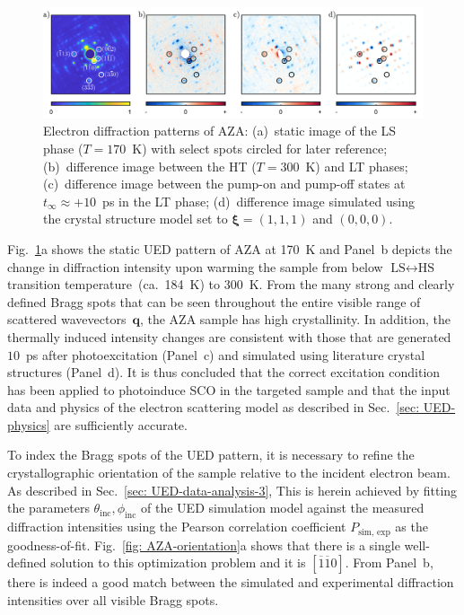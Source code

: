 \begin{figure}[ht!]
  \centering
  \includegraphics[width = \textwidth]{Figures/fig_AZA_UEDimages.pdf}
  \caption[Static and time-resolved electron diffraction patterns of AZA.]{
    Electron diffraction patterns of AZA:
    (a)~static image of the LS phase ($T = 170$~K) with select spots circled for later reference;
    (b)~difference image between the HT ($T = 300$~K) and LT phases;
    (c)~difference image between the pump-on and pump-off states at $t_\infty \approx +10$~ps in the LT phase;
    (d)~difference image simulated using the crystal structure model
    set to $\boldsymbol{\xi} = (1, 1, 1)$ and $(0, 0, 0)$.
  }
  \label{fig: AZA-UEDimages}
\end{figure}

Fig.~\ref{fig: AZA-UEDimages}a shows the static UED pattern of AZA at 170~K
and Panel~b depicts the change in diffraction intensity upon warming the sample
from below $\text{LS} \leftrightarrow \text{HS}$ transition temperature~(ca.~184~K) to 300~K.
From the many strong and clearly defined Bragg spots that can be seen
throughout the entire visible range of scattered wavevectors~$\boldsymbol{q}$,
the AZA sample has high crystallinity.
%
In addition, the thermally induced intensity changes are consistent with
those that are generated $10$~ps after photoexcitation (Panel~c) and
simulated using literature crystal structures (Panel~d).
%
It is thus concluded that the correct excitation condition has been applied
to photoinduce SCO in the targeted sample and that the input data and physics
of the electron scattering model as described in Sec.~\ref{sec: UED-physics}
are sufficiently accurate.

To index the Bragg spots of the UED pattern, it is necessary to refine
the crystallographic orientation of the sample relative to the incident electron beam.
%
As described in Sec.~\ref{sec: UED-data-analysis-3},
This is herein achieved by fitting the parameters $\theta_\text{inc}, \phi_\text{inc}$
of the UED simulation model against the measured diffraction intensities
using the Pearson correlation coefficient $P_\text{sim, exp}$ as the goodness-of-fit.
%
Fig.~\ref{fig: AZA-orientation}a shows that there is a single well-defined solution
to this optimization problem and it is $[\overline{1} \overline{1} 0]$.
From Panel~b, there is indeed a good match between the simulated
and experimental diffraction intensities over all visible Bragg spots.

